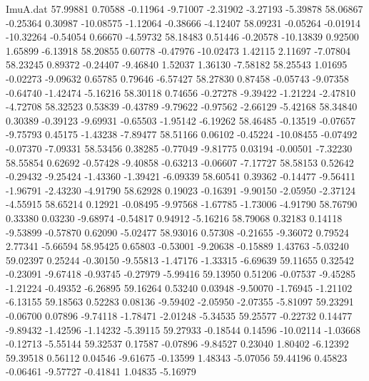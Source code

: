 \begin{filecontents}{ImuA.dat}
  57.99881    0.70588   -0.11964   -9.71007   -2.31902   -3.27193   -5.39878
  58.06867   -0.25364    0.30987  -10.08575   -1.12064   -0.38666   -4.12407
  58.09231   -0.05264   -0.01914  -10.32264   -0.54054    0.66670   -4.59732
  58.18483    0.51446   -0.20578  -10.13839    0.92500    1.65899   -6.13918
  58.20855    0.60778   -0.47976  -10.02473    1.42115    2.11697   -7.07804
  58.23245    0.89372   -0.24407   -9.46840    1.52037    1.36130   -7.58182
  58.25543    1.01695   -0.02273   -9.09632    0.65785    0.79646   -6.57427
  58.27830    0.87458   -0.05743   -9.07358   -0.64740   -1.42474   -5.16216
  58.30118    0.74656   -0.27278   -9.39422   -1.21224   -2.47810   -4.72708
  58.32523    0.53839   -0.43789   -9.79622   -0.97562   -2.66129   -5.42168
  58.34840    0.30389   -0.39123   -9.69931   -0.65503   -1.95142   -6.19262
  58.46485   -0.13519   -0.07657   -9.75793    0.45175   -1.43238   -7.89477
  58.51166    0.06102   -0.45224  -10.08455   -0.07492   -0.07370   -7.09331
  58.53456    0.38285   -0.77049   -9.81775    0.03194   -0.00501   -7.32230
  58.55854    0.62692   -0.57428   -9.40858   -0.63213   -0.06607   -7.17727
  58.58153    0.52642   -0.29432   -9.25424   -1.43360   -1.39421   -6.09339
  58.60541    0.39362   -0.14477   -9.56411   -1.96791   -2.43230   -4.91790
  58.62928    0.19023   -0.16391   -9.90150   -2.05950   -2.37124   -4.55915
  58.65214    0.12921   -0.08495   -9.97568   -1.67785   -1.73006   -4.91790
  58.76790    0.33380    0.03230   -9.68974   -0.54817    0.94912   -5.16216
  58.79068    0.32183    0.14118   -9.53899   -0.57870    0.62090   -5.02477
  58.93016    0.57308   -0.21655   -9.36072    0.79524    2.77341   -5.66594
  58.95425    0.65803   -0.53001   -9.20638   -0.15889    1.43763   -5.03240
  59.02397    0.25244   -0.30150   -9.55813   -1.47176   -1.33315   -6.69639
  59.11655    0.32542   -0.23091   -9.67418   -0.93745   -0.27979   -5.99416
  59.13950    0.51206   -0.07537   -9.45285   -1.21224   -0.49352   -6.26895
  59.16264    0.53240    0.03948   -9.50070   -1.76945   -1.21102   -6.13155
  59.18563    0.52283    0.08136   -9.59402   -2.05950   -2.07355   -5.81097
  59.23291   -0.06700    0.07896   -9.74118   -1.78471   -2.01248   -5.34535
  59.25577   -0.22732    0.14477   -9.89432   -1.42596   -1.14232   -5.39115
  59.27933   -0.18544    0.14596  -10.02114   -1.03668   -0.12713   -5.55144
  59.32537    0.17587   -0.07896   -9.84527    0.23040    1.80402   -6.12392
  59.39518    0.56112    0.04546   -9.61675   -0.13599    1.48343   -5.07056
  59.44196    0.45823   -0.06461   -9.57727   -0.41841    1.04835   -5.16979

\end{filecontents}

